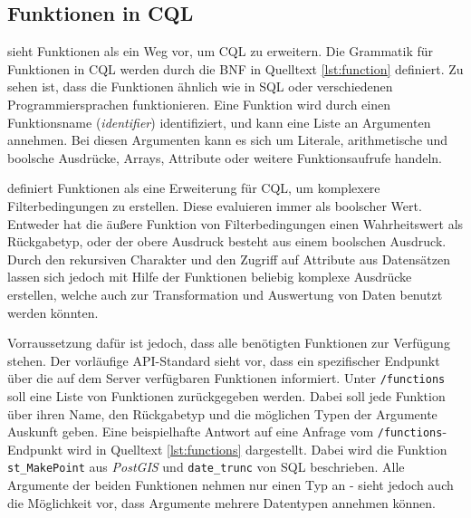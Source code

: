 \newcommand{\rfgfrjfn}{\footnote{\textcite{ogcFiltering}, \texttt{/req/functions/get-functions-response-json}}}

\subsection{Funktionen in \acl{CQL}}
\label{sec:functions}

 sieht Funktionen als ein Weg vor, um \ac{CQL} zu erweitern. Die Grammatik für Funktionen in \ac{CQL} werden durch die \ac{BNF} in Quelltext \ref{lst:function} definiert. Zu sehen ist, dass die Funktionen ähnlich wie in \ac{SQL} oder verschiedenen Programmiersprachen funktionieren. Eine Funktion wird durch einen Funktionsname (\textit{identifier}) identifiziert, und kann eine Liste an Argumenten annehmen. Bei diesen Argumenten kann es sich um Literale, arithmetische und boolsche Ausdrücke, Arrays, Attribute oder weitere Funktionsaufrufe handeln.



 definiert Funktionen als eine Erweiterung für \ac{CQL}, um komplexere Filterbedingungen zu erstellen. Diese evaluieren immer als boolscher Wert. Entweder hat die äußere Funktion von Filterbedingungen einen Wahrheitswert als Rückgabetyp, oder der obere Ausdruck besteht aus einem boolschen Ausdruck. Durch den rekursiven Charakter und den Zugriff auf Attribute aus Datensätzen lassen sich jedoch mit Hilfe der Funktionen beliebig komplexe Ausdrücke erstellen, welche auch zur Transformation und Auswertung von Daten benutzt werden könnten.

Vorraussetzung dafür ist jedoch, dass alle benötigten Funktionen zur Verfügung stehen. Der vorläufige \ac{API}-Standard sieht vor, dass ein spezifischer Endpunkt über die auf dem Server verfügbaren Funktionen informiert. Unter \texttt{/functions} soll eine Liste von Funktionen zurückgegeben werden. Dabei soll jede Funktion über ihren Name, den Rückgabetyp und die möglichen Typen der Argumente Auskunft geben. Eine beispielhafte Antwort auf eine Anfrage vom \texttt{/functions}-Endpunkt wird in Quelltext \ref{lst:functions} dargestellt. Dabei wird die Funktion \texttt{st\_MakePoint} aus \textit{PostGIS} und \texttt{date\_trunc} von \ac{SQL} beschrieben. Alle Argumente der beiden Funktionen nehmen nur einen Typ an -  sieht jedoch auch die Möglichkeit vor, dass Argumente mehrere Datentypen annehmen können.

